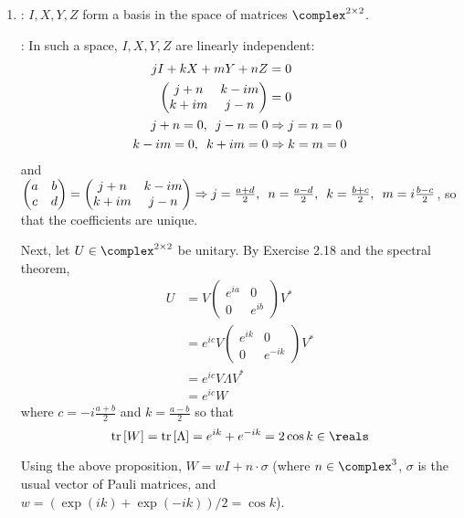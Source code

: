 \begingroup
\newcommand{\tr}[1]{\mathrm{tr} \left[ #1 \right]}
\newcommand{\re}[1]{\mathrm{Re} \left( #1 \right)}
\newcommand{\expo}[1]{\exp \left( #1 \right)}
\newcommand{\coso}[1]{\cos \left( #1 \right)}
\newcommand{\sino}[1]{\sin \left( #1 \right)}
%
\begin{enumerate}
\item {}: $I, X, Y, Z$ form a basis in the space of matrices $\complex^{2 \times 2}$.
%
\par \proof: In such a space, $I, X, Y, Z$ are linearly independent:
%
\begin{align}
j I + k X + m Y + n Z &= 0 \\
\begin{pmatrix} j + n & k - i m \\ k + i m & j - n \end{pmatrix} &= 0 \\
j + n = 0, \enskip j - n = 0 &\Rightarrow j = n = 0 \\
k - i m = 0, \enskip k + i m = 0 &\Rightarrow k = m = 0
\end{align}
%
and $\begin{pmatrix} a & b \\ c & d \end{pmatrix} = \begin{pmatrix} j + n & k - i m \\ k + i m & j - n \end{pmatrix} \Rightarrow j = \frac{a+d}{2}, \enskip n = \frac{a-d}{2}, \enskip k = \frac{b+c}{2}, \enskip m = i \frac{b-c}{2}$, so that the coefficients are unique.
%
\par Next, let $U \in \complex^{2 \times 2}$ be unitary.
%
By Exercise 2.18 and the spectral theorem,
%
\begin{align}
U &= V \begin{pmatrix} e^{ia} & 0 \\ 0 & e^{ib} \end{pmatrix} V^* \\
&= e^{ic} V \begin{pmatrix} e^{ik} & 0 \\ 0 & e^{-i k} \end{pmatrix} V^* \\
&= e^{ic} V \Lambda V^* \\
&= e^{ic} W
\end{align}
%
where $c = -i\frac{a+b}{2}$ and $k = \frac{a-b}{2}$ so that
%
$$
\tr{W} = \tr{\Lambda} = e^{ik} + e^{-ik} = 2 \cos k \in \reals
$$
%
\par Using the above proposition, $W = w I + n \cdot \sigma$ (where $n \in \complex^3$, $\sigma$ is the usual vector of Pauli matrices, and $w = \left( \expo{ik} + \expo{-ik} \right) / 2 = \cos k$).

\end{enumerate}
